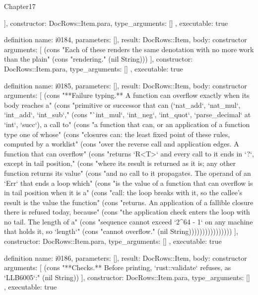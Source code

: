 \begin{lexlean}{Chapter17}
\begin{semanticmodule}
{{    ],
    constructor: DocRows::Item.para,
    type_arguments: []
  },
  executable: true
}

definition{
  name: i0184,
  parameters: [],
  result: DocRows::Item,
  body: constructor{
    arguments: [
      (cons "Each of these renders the same denotation with no more work than the plain" (cons "rendering." (nil String)))
    ],
    constructor: DocRows::Item.para,
    type_arguments: []
  },
  executable: true
}

definition{
  name: i0185,
  parameters: [],
  result: DocRows::Item,
  body: constructor{
    arguments: [
      (cons "**Failure typing.** A function can overflow exactly when its body reaches a" (cons "primitive or successor that can (`nat_add`, `nat_mul`, `int_add`, `int_sub`," (cons "`int_mul`, `int_neg`, `int_quot`, `parse_decimal` at `int`, `succ`), a call to" (cons "a function that can, or an application of a function type one of whose" (cons "closures can: the least fixed point of these rules, computed by a worklist" (cons "over the reverse call and application edges. A function that can overflow" (cons "returns `R<T>` and every call to it ends in `?`, except in tail position," (cons "where its result is returned as it is; any other function returns its value" (cons "and no call to it propagates. The operand of an `Err` that ends a loop which" (cons "is the value of a function that can overflow is in tail position when it is a" (cons "call: the loop breaks with it, so the callee's result is the value the function" (cons "returns. An application of a fallible closure there is refused today, because" (cons "the application check enters the loop with no tail. The length of a" (cons "sequence cannot exceed `2^64 - 1` on any machine that holds it, so `length`" (cons "cannot overflow." (nil String))))))))))))))))
    ],
    constructor: DocRows::Item.para,
    type_arguments: []
  },
  executable: true
}

definition{
  name: i0186,
  parameters: [],
  result: DocRows::Item,
  body: constructor{
    arguments: [
      (cons "**Checks.** Before printing, `rust::validate` refuses, as `LLB6005`:" (nil String))
    ],
    constructor: DocRows::Item.para,
    type_arguments: []
  },
  executable: true
}


\end{semanticmodule}
\end{lexlean}
